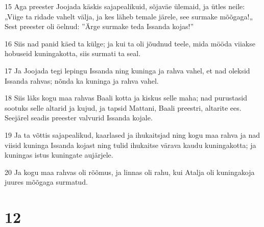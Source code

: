 \par 15 Aga preester Joojada käskis sajapealikuid, sõjaväe ülemaid, ja ütles neile: „Viige ta ridade vahelt välja, ja kes läheb temale järele, see surmake mõõgaga!„ Sest preester oli öelnud: ”Ärge surmake teda Issanda kojas!”
\par 16 Siis nad panid käed ta külge; ja kui ta oli jõudnud teele, mida mööda viiakse hobuseid kuningakotta, siis surmati ta seal.
\par 17 Ja Joojada tegi lepingu Issanda ning kuninga ja rahva vahel, et nad oleksid Issanda rahvas; nõnda ka kuninga ja rahva vahel.
\par 18 Siis läks kogu maa rahvas Baali kotta ja kiskus selle maha; nad purustasid sootuks selle altarid ja kujud, ja tapsid Mattani, Baali preestri, altarite ees. Seejärel seadis preester valvurid Issanda kojale.
\par 19 Ja ta võttis sajapealikud, kaarlased ja ihukaitsjad ning kogu maa rahva ja nad viisid kuninga Issanda kojast ning tulid ihukaitse värava kaudu kuningakotta; ja kuningas istus kuningate aujärjele.
\par 20 Ja kogu maa rahvas oli rõõmus, ja linnas oli rahu, kui Atalja oli kuningakoja juures mõõgaga surmatud.

\chapter{12}

